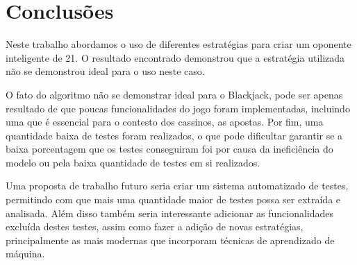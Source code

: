 \section{Conclusões}

    Neste trabalho abordamos o uso de diferentes estratégias para 
    criar um oponente inteligente de 21. O resultado encontrado demonstrou 
    que a estratégia utilizada não se demonstrou ideal para o uso neste caso. 

    O fato do algoritmo não se demonstrar ideal para o Blackjack, pode ser 
    apenas resultado de que poucas funcionalidades do jogo foram implementadas, incluindo 
    uma que é essencial para o contesto dos cassinos, as apostas. Por fim, uma quantidade
    baixa de testes foram realizados, o que pode dificultar garantir se a baixa porcentagem
    que os testes conseguiram foi por causa da ineficiência do modelo ou pela 
    baixa quantidade de testes em si realizados.

    Uma proposta de trabalho futuro seria criar um sistema automatizado 
    de testes, permitindo com que mais uma quantidade maior de testes 
    possa ser extraída e analisada. Além disso também seria interessante 
    adicionar as funcionalidades excluída destes testes, assim como 
    fazer a adição de novas estratégias, principalmente as mais modernas que 
    incorporam técnicas de aprendizado de máquina.